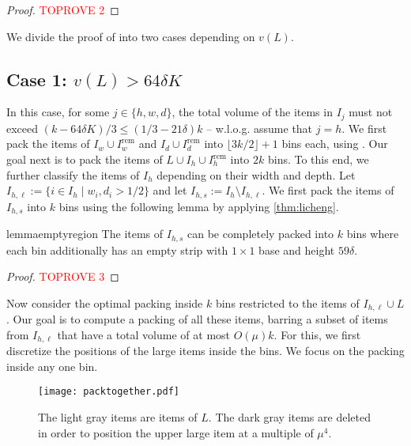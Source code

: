 \documentclass[a4paper,UKenglish,cleveref, autoref, thm-restate]{lipics-v2021}
\begin{document}
\begin{proof}\textcolor{red}{TOPROVE 2}\end{proof}

We divide the proof of  into two cases depending on $v(L)$.



\subsection{Case 1: \texorpdfstring{$v(L) > 64\delta K$}{large volume of L}}
In this case, for some $j\in \{h,w,d\}$, the total volume of the items in $I_{j}$ must not exceed $(k-64\delta K)/3 \le (1/3 - 21\delta)k$ -- w.l.o.g. assume that $j=h$. We first pack the items of $I_w \cup I^{\text{rem}}_w$ and $I_d \cup I^{\text{rem}}_d$ into $\lfloor 3k/2\rfloor +1$ bins each,  using . Our goal next is to pack the items of $L \cup I_h \cup I^{\text{rem}}_h$ into $2k$ bins.
To this end, we further classify the items of $I_h$ depending on their width and depth. Let $I_{h,\ell} := \{i\in I_h \mid w_i, d_i > 1/2\}$ and let $I_{h,s}:= I_h \setminus I_{h,\ell}$. We first pack the items of $I_{h,s}$ into $k$ bins using the following lemma by applying \cref{thm:licheng}.



\begin{restatable}{lemma}{emptyregion}
\label{lem:emptyregion}
    The items of $I_{h,s}$ can be completely packed into $k$ bins where each bin additionally has an empty strip with $1\times 1$ base and height $59\delta$.
\end{restatable}
\begin{proof}\textcolor{red}{TOPROVE 3}\end{proof}


Now consider the optimal packing inside $k$ bins restricted to the items of $I_{h,\ell}\cup L$. Our goal is to compute a packing of all these items, barring a subset of items from $I_{h,\ell}$ that have a total volume of at most $O(\mu)k$. 
For this, we first discretize the positions of the large items inside the bins. We focus on the packing inside any one bin.

\begin{figure}
    \centering
    \texttt{[image: packtogether.pdf]}
    \caption{The light gray items are items of $L$. The dark gray items are deleted in order to position the upper large item at a multiple of $\mu^4$.}
    \label{fig:discretize}
    \end{figure}
\end{document}
